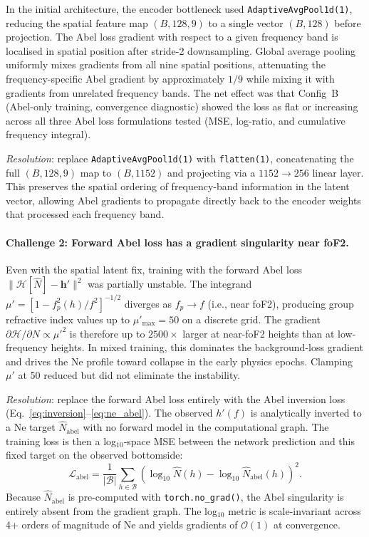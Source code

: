 \documentclass[11pt,twocolumn]{article}
\begin{document}
In the initial architecture, the encoder bottleneck used
\texttt{AdaptiveAvgPool1d(1)}, reducing the spatial feature map $(B, 128, 9)$
to a single vector $(B, 128)$ before projection.
The Abel loss gradient with respect to a given frequency band is localised in
spatial position after stride-2 downsampling.
Global average pooling uniformly mixes gradients from all nine spatial positions,
attenuating the frequency-specific Abel gradient by approximately $1/9$ while
mixing it with gradients from unrelated frequency bands.
The net effect was that Config~B (Abel-only training, convergence diagnostic)
showed the loss as flat or increasing across all three Abel loss formulations
tested (MSE, log-ratio, and cumulative frequency integral).

\textit{Resolution}: replace \texttt{AdaptiveAvgPool1d(1)} with
\texttt{flatten(1)}, concatenating the full $(B, 128, 9)$ map to $(B, 1152)$
and projecting via a $1152 \to 256$ linear layer.
This preserves the spatial ordering of frequency-band information in the latent
vector, allowing Abel gradients to propagate directly back to the encoder weights
that processed each frequency band.

\paragraph{Challenge 2: Forward Abel loss has a gradient singularity near foF2.}

Even with the spatial latent fix, training with the forward Abel loss
$\|\mathcal{H}[\hat{N}] - \mathbf{h}'\|^2$ was partially unstable.
The integrand $\mu' = [1 - f_p^2(h)/f^2]^{-1/2}$ diverges as $f_p \to f$
(i.e., near foF2), producing group refractive index values up to $\mu'_\text{max}
= 50$ on a discrete grid.
The gradient $\partial \mathcal{H}/\partial N \propto \mu'^2$ is therefore up to
$2500\times$ larger at near-foF2 heights than at low-frequency heights.
In mixed training, this dominates the background-loss gradient and drives the
Ne profile toward collapse in the early physics epochs.
Clamping $\mu'$ at 50 reduced but did not eliminate the instability.

\textit{Resolution}: replace the forward Abel loss entirely with the Abel
inversion loss (Eq.~\ref{eq:inversion}--\ref{eq:ne_abel}).
The observed $h'(f)$ is analytically inverted to a Ne target
$\hat{N}_\text{abel}$ with no forward model in the computational graph.
The training loss is then a log$_{10}$-space MSE between the network prediction
and this fixed target on the observed bottomside:
\begin{equation}
  \mathcal{L}_\text{abel} =
  \frac{1}{|\mathcal{B}|}\sum_{h\in\mathcal{B}}
  \!\left(\log_{10}\hat{N}(h) - \log_{10}\hat{N}_\text{abel}(h)\right)^2.
  \label{eq:loss_abel}
\end{equation}
Because $\hat{N}_\text{abel}$ is pre-computed with \texttt{torch.no\_grad()},
the Abel singularity is entirely absent from the gradient graph.
The log$_{10}$ metric is scale-invariant across 4+ orders of magnitude of Ne
and yields gradients of $\mathcal{O}(1)$ at convergence.
\end{document}

